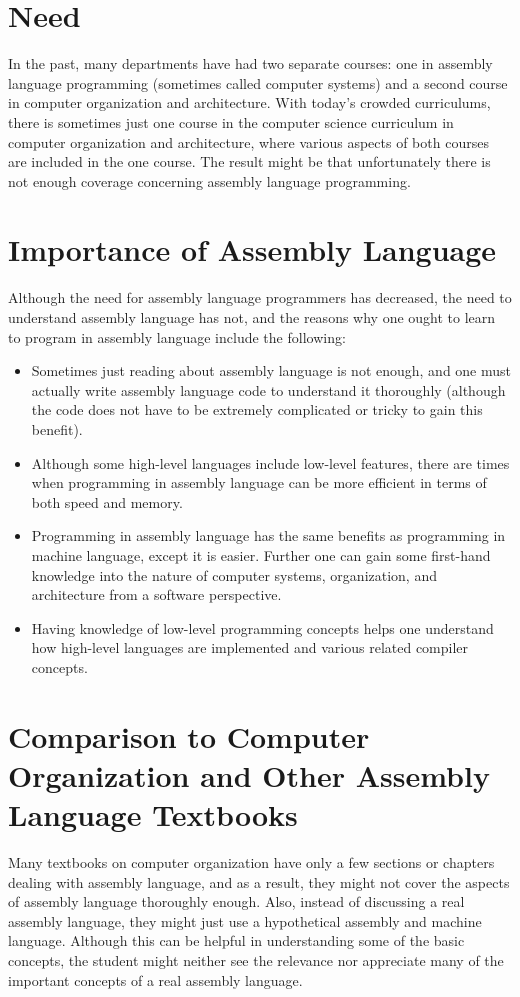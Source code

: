 \documentclass[10pt]{book}
\begin{document}
\section*{Need}
In the past, many departments have had two separate courses: one in assembly language programming (sometimes called computer systems) and a second course in computer organization and architecture. With today's crowded curriculums, there is sometimes just one course in the computer science curriculum in computer organization and architecture, where various aspects of both courses are included in the one course. The result might be that unfortunately there is not enough coverage concerning assembly language programming.

\section*{Importance of Assembly Language}
Although the need for assembly language programmers has decreased, the need to understand assembly language has not, and the reasons why one ought to learn to program in assembly language include the following:

\begin{itemize}
  \item Sometimes just reading about assembly language is not enough, and one must actually write assembly language code to understand it thoroughly (although the code does not have to be extremely complicated or tricky to gain this benefit).
  \item Although some high-level languages include low-level features, there are times when programming in assembly language can be more efficient in terms of both speed and memory.
  \item Programming in assembly language has the same benefits as programming in machine language, except it is easier. Further one can gain some first-hand\\

knowledge into the nature of computer systems, organization, and architecture from a software perspective.
  \item Having knowledge of low-level programming concepts helps one understand how high-level languages are implemented and various related compiler concepts.
\end{itemize}

\section*{Comparison to Computer Organization and Other Assembly Language Textbooks}
Many textbooks on computer organization have only a few sections or chapters dealing with assembly language, and as a result, they might not cover the aspects of assembly language thoroughly enough. Also, instead of discussing a real assembly language, they might just use a hypothetical assembly and machine language. Although this can be helpful in understanding some of the basic concepts, the student might neither see the relevance nor appreciate many of the important concepts of a real assembly language.
\end{document}
